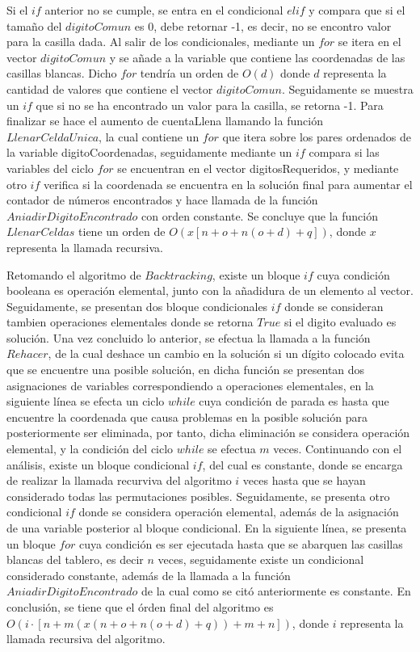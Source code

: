 \documentclass[journal]{IEEEtran}
\begin{document}
\begin{itemize}
		Si el $if$ anterior no se cumple, se entra en el condicional $elif$ y compara que si el tamaño del $digitoComun$ es 0, debe retornar -1, es decir, no se encontro valor para la casilla dada.
		Al salir de los condicionales, mediante un $for$ se itera en el vector $digitoComun$ y se añade a la variable que contiene las coordenadas de las casillas blancas. Dicho $for$ tendría un orden de
		$O(d)$ donde $d$ representa la cantidad de valores que contiene el vector $digitoComun$. Seguidamente se muestra un $if$ que si no se ha encontrado un valor para la casilla, se retorna -1.
		Para finalizar se hace el aumento de cuentaLlena llamando la función $LlenarCeldaUnica$, la cual contiene un $for$ que itera sobre los pares ordenados de la variable digitoCoordenadas, seguidamente mediante un $if$ compara si las variables del ciclo $for$ se encuentran en el vector digitosRequeridos, y mediante otro $if$ verifica si la coordenada se encuentra en la solución final para aumentar el contador de números encontrados y hace llamada de la función $AniadirDigitoEncontrado$ con orden constante. Se concluye que la función $LlenarCeldas$ tiene un orden de $O(x[n + o + n(o + d) + q])$, donde $x$ representa la llamada recursiva.
	
		
		Retomando el algoritmo de $Backtracking$, existe un bloque $if$ cuya condición booleana es operación elemental, junto con la añadidura de un elemento al vector. Seguidamente, se presentan dos bloque condicionales $if$ donde se consideran tambien operaciones elementales donde se retorna $True$ si el digito evaluado es solución. Una vez concluido lo anterior, se efectua la llamada a la función $Rehacer$, de la cual deshace un cambio en la solución si un dígito colocado evita que se encuentre una posible solución, en dicha función se presentan dos asignaciones de variables correspondiendo a operaciones elementales, en la siguiente línea se efecta un ciclo $while$ cuya condición de parada es hasta que encuentre la coordenada que causa problemas en la posible solución para posteriormente ser eliminada, por tanto, dicha eliminación se considera operación elemental, y la condición del ciclo $while$ se efectua $m$ veces.
		Continuando con el análisis, existe un bloque condicional $if$, del cual es constante, donde se encarga de realizar la llamada recurviva del algoritmo $i$ veces hasta que se hayan considerado todas las permutaciones posibles. Seguidamente, se presenta otro condicional $if$ donde se considera operación elemental, además de la asignación de una variable posterior al bloque condicional. En la siguiente línea, se presenta un bloque $for$ cuya condición es ser ejecutada hasta que se abarquen las casillas blancas del tablero, es decir $n$ veces, seguidamente existe un condicional considerado constante, además de la llamada a la función $AniadirDigitoEncontrado$ de la cual como se citó anteriormente es constante.
		En conclusión, se tiene que el órden final del algoritmo es $O(i \cdot [n + m(x(n + o + n(o + d) + q)) + m + n])$, donde $i$ representa la llamada recursiva del algoritmo.
		

\end{itemize}
\end{document}
